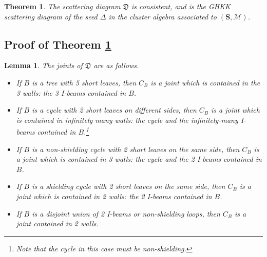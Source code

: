\documentclass{amsart}
\newtheorem{theorem}[proposition]{Theorem}
\newtheorem{lemma}[proposition]{Lemma}
\theoremstyle{definition}
\theoremstyle{remark}
\numberwithin{equation}{section}
\newcommand{\0}{{\mathbf{0}}}
\newcommand{\M}{\mathcal{M}}
\renewcommand{\S}{\mathbf{S}}
\begin{document}
\begin{theorem}\label{thm: consistent}
The scattering diagram $\mathfrak{D}$ is consistent, and is the GHKK scattering diagram of the seed $\Delta$ in the cluster algebra associated to $(\S,\M)$.
\end{theorem}

\subsection{Proof of Theorem \ref{thm: consistent}}

\begin{lemma}
The joints of $\mathfrak{D}$ are as follows.%
\begin{itemize}
	\item If $B$ is a tree with 5 short leaves, then $C_B$ is a joint which is contained in the 3 walls: the 3 I-beams contained in $B$.
	\item If $B$ is a cycle with 2 short leaves on different sides, then $C_B$ is a joint which is contained in infinitely many walls: the cycle and the infinitely-many I-beams contained in $B$.\footnote{Note that the cycle in this case must be non-shielding.}
	\item If $B$ is a non-shielding cycle with 2 short leaves on the same side, then $C_B$ is a joint which is contained in 3 walls: the cycle and the 2 I-beams contained in $B$.
	\item If $B$ is a shielding cycle with 2 short leaves on the same side, then $C_B$ is a joint which is contained in 2 walls: the 2 I-beams contained in $B$.
	\item If $B$ is a disjoint union of 2 I-beams or non-shielding loops, then $C_B$ is a joint contained in 2 walls.
\end{itemize}
\end{lemma}
\end{document}
